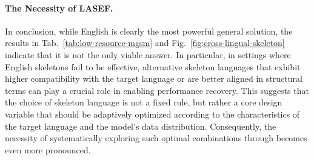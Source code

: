 \paragraph{The Necessity of LASEF.}
In conclusion, while English is clearly the most powerful general solution, the results in Tab.~\ref{tab:low-resource-mgsm} and Fig.~\ref{fig:cross-lingual-skeleton} indicate that it is not the only viable answer. In particular, in settings where English skeletons fail to be effective, alternative skeleton languages that exhibit higher compatibility with the target language or are better aligned in structural terms can play a crucial role in enabling performance recovery. This suggests that the choice of skeleton language is not a fixed rule, but rather a core design variable that should be adaptively optimized according to the characteristics of the target language and the model’s data distribution. Consequently, the necessity of systematically exploring such optimal combinations through \LASEF becomes even more pronounced.